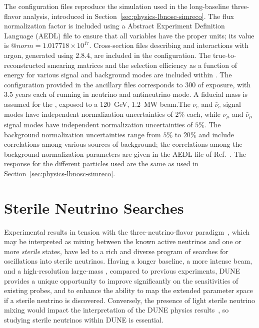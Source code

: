The   configuration files reproduce the  simulation used in the long-baseline three-flavor analysis, introduced in Section~\ref{sec:physics-lbnosc-simreco}.
The flux normalization factor is included using a  Abstract Experiment Definition Language (AEDL) 
file to ensure that all variables have the proper units; its value is $@norm = 1.017718\times 10^{17}$. Cross-section files describing  and  interactions with argon, generated using  2.8.4, are included in the configuration. The true-to-reconstructed smearing matrices and the selection efficiency as a function of energy for various signal and background modes are included within . The   configuration provided in the ancillary files corresponds to \SI{300}{\ktMWyr} of exposure, with 3.5 years each of running in neutrino and antineutrino mode. A \fdfiducialmass fiducial mass is assumed for the , exposed to a \SI{120}{GeV}, \SI{1.2}{MW} beam.The $\nu_{e}$ and $\bar\nu_{e}$ signal modes have independent normalization uncertainties of $2\%$ each, while $\nu_{\mu}$ and $\bar{\nu}_{\mu}$ signal modes have independent normalization uncertainties of $5\%$. The background normalization uncertainties range from $5\%$ to $20\%$ and include
correlations among various sources of background; the correlations among the background normalization parameters are given in the AEDL file of Ref.~\cite{Alion:2016uaj}. The  response for the different particles used are the same as used in Section~\ref{sec:physics-lbnosc-simreco}.



\section{Sterile Neutrino Searches}
Experimental results in tension with the three-neutrino-flavor paradigm~\cite{LSNDSterile,MiniBooNESterile,GalliumSummary,ReactorSummary, ref:tension,Gariazzo:2017fdh}, which may be interpreted as mixing between the known active neutrinos and one or more \textit{sterile} states, have led to a rich and diverse program of searches for oscillations into sterile neutrinos. Having a longer baseline, a more intense beam, and a high-resolution large-mass , %
compared to previous experiments, DUNE provides a unique opportunity to improve significantly on the sensitivities of existing probes, and to enhance the ability to map the extended parameter space if a sterile neutrino is discovered. Conversely, the presence of light sterile neutrino mixing would impact the interpretation of the DUNE physics results~\cite{Dutta:2016glq}, so studying sterile neutrinos within DUNE is essential.
	
